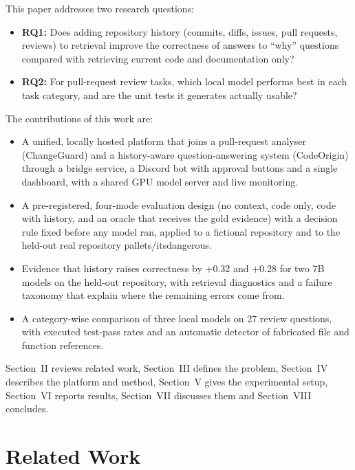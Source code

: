 \documentclass[12pt,onecolumn,draftclsnofoot]{IEEEtran}
\begin{document}
This paper addresses two research questions:
\begin{itemize}
\item \textbf{RQ1:} Does adding repository history (commits, diffs, issues, pull requests, reviews) to retrieval improve the correctness of answers to ``why'' questions compared with retrieving current code and documentation only?
\item \textbf{RQ2:} For pull-request review tasks, which local model performs best in each task category, and are the unit tests it generates actually usable?
\end{itemize}

The contributions of this work are:
\begin{itemize}
\item A unified, locally hosted platform that joins a pull-request analyser (ChangeGuard) and a history-aware question-answering system (CodeOrigin) through a bridge service, a Discord bot with approval buttons and a single dashboard, with a shared GPU model server and live monitoring.
\item A pre-registered, four-mode evaluation design (no context, code only, code with history, and an oracle that receives the gold evidence) with a decision rule fixed before any model ran, applied to a fictional repository and to the held-out real repository pallets/itsdangerous.
\item Evidence that history raises correctness by +0.32 and +0.28 for two 7B models on the held-out repository, with retrieval diagnostics and a failure taxonomy that explain where the remaining errors come from.
\item A category-wise comparison of three local models on 27 review questions, with executed test-pass rates and an automatic detector of fabricated file and function references.
\end{itemize}

Section~II reviews related work, Section~III defines the problem, Section~IV describes the platform and method, Section~V gives the experimental setup, Section~VI reports results, Section~VII discusses them and Section~VIII concludes.

\section{Related Work}
\end{document}
